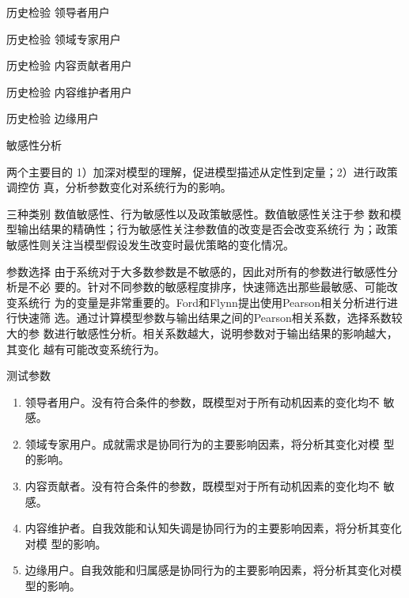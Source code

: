 \documentclass[slidestop,compress,mathserif,table]{beamer}
\begin{document}
   \begin{frame}{历史检验}
     领导者用户
\scalebox{0.8}{} 
   \end{frame}

   \begin{frame}{历史检验}
     领域专家用户
\scalebox{0.8}{} 
   \end{frame}

   \begin{frame}{历史检验}
     内容贡献者用户
\scalebox{0.8}{} 
   \end{frame}

   \begin{frame}{历史检验}
     内容维护者用户
\scalebox{0.8}{} 
   \end{frame}

   \begin{frame}{历史检验}
     边缘用户
\scalebox{0.8}{} 
   \end{frame}
   \begin{frame}{敏感性分析}
     \begin{block}{两个主要目的}
1）加深对模型的理解，促进模型描述从定性到定量；2）进行政策调控仿
真，分析参数变化对系统行为的影响。
     \end{block} \vfill
     \begin{block}{三种类别}
       数值敏感性、行为敏感性以及政策敏感性。数值敏感性关注于参
数和模型输出结果的精确性；行为敏感性关注参数值的改变是否会改变系统行
为；政策敏感性则关注当模型假设发生改变时最优策略的变化情况。
     \end{block}
   \end{frame}

   \begin{frame}{参数选择}
     由于系统对于大多数参数是不敏感的，因此对所有的参数进行敏感性分析是不必
要的。针对不同参数的敏感程度排序，快速筛选出那些最敏感、可能改变系统行
为的变量是非常重要的。Ford和Flynn提出使用Pearson相关分析进行进行快速筛
选。通过计算模型参数与输出结果之间的Pearson相关系数，选择系数较大的参
数进行敏感性分析。相关系数越大，说明参数对于输出结果的影响越大，其变化
越有可能改变系统行为。
   \end{frame}

   \begin{frame}{测试参数}
     \begin{enumerate}
\item 领导者用户。没有符合条件的参数，既模型对于所有动机因素的变化均不
  敏感。
\item 领域专家用户。成就需求是协同行为的主要影响因素，将分析其变化对模
  型的影响。
\item 内容贡献者。没有符合条件的参数，既模型对于所有动机因素的变化均不
  敏感。
\item 内容维护者。自我效能和认知失调是协同行为的主要影响因素，将分析其变化对模
  型的影响。
\item 边缘用户。自我效能和归属感是协同行为的主要影响因素，将分析其变化对模
  型的影响。
\end{enumerate}
   \end{frame}
\end{document}
